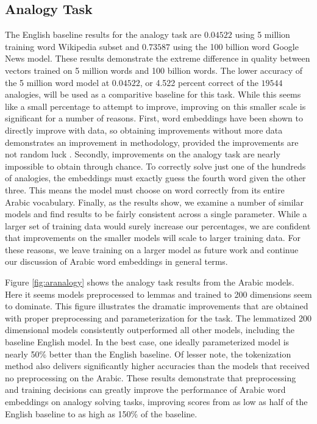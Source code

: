 



\subsection{Analogy Task}

The English baseline results for the analogy task are $0.04522$ using 5 million training word Wikipedia subset and $0.73587$ using the 100 billion word Google News model. These results demonstrate the extreme difference in quality between vectors trained on 5 million words and 100 billion words. The lower accuracy of the 5 million word model at $0.04522$, or 4.522 percent correct of the $19544$ analogies, will be used as a comparitive baseline for this task. While this seems like a small percentage to attempt to improve, improving on this smaller scale is significant for a number of reasons. First, word embeddings have been shown to directly improve with data, so obtaining improvements without more data demonstrates an improvement in methodology, provided the improvements are not random luck \cite{mikolovdist:2013}. Secondly, improvements on the analogy task are nearly impossible to obtain through chance. To correctly solve just one of the hundreds of analogies, the embeddings must exactly guess the fourth word given the other three. This means the model must choose on word correctly from its entire Arabic vocabulary. Finally, as the results show, we examine a number of similar models and find results to be fairly consistent across a single parameter. While a larger set of training data would surely increase our percentages, we are confident that improvements on the smaller models will scale to larger training data. For these reasons, we leave training on a larger model as future work and continue our discussion of Arabic word embeddings in general terms.

Figure \ref{fig:aranalogy} shows the analogy task results from the Arabic models. Here it seems models preprocessed to lemmas and trained to 200 dimensions seem to dominate. This figure illustrates the dramatic improvements that are obtained with proper preprocessing and parameterization for the task. The lemmatized 200 dimensional models consistently outperformed all other models, including the baseline English model. In the best case, one ideally parameterized model is nearly 50\% better than the English baseline. Of lesser note, the tokenization method also delivers significantly higher accuracies than the models that received no preprocessing on the Arabic. These results demonstrate that preprocessing and training decisions can greatly improve the performance of Arabic word embeddings on analogy solving tasks, improving scores from as low as half of the English baseline to as high as 150\% of the baseline.

